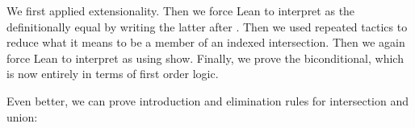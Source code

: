 \documentclass[letterpaper,10pt,english]{sphinxmanual}
\begin{document}
\begin{sphinxVerbatim}[commandchars=\\\{\}]
             
                      
               
           
\end{sphinxVerbatim}

\sphinxAtStartPar
We first applied extensionality.
Then we force Lean to interpret 
as the definitionally equal 
by writing the latter after .
Then we used repeated  tactics to reduce what it means
to be a member of an indexed intersection.
Then we again force Lean to interpret  as
 using show.
Finally, we prove the biconditional,
which is now entirely in terms of first order logic.

\sphinxAtStartPar
Even better,
we can prove introduction and elimination rules for intersection and union:
\end{document}
